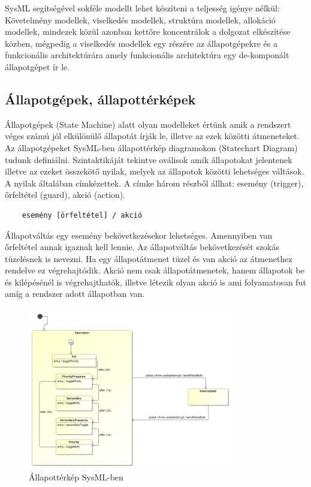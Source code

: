 SysML segítségével sokféle modellt lehet készíteni a teljesség igénye nélkül: Követelmény modellek, viselkedés modellek, struktúra modellek, allokáció modellek, mindezek közül azonban kettőre koncentrálok a dolgozat elkészítése közben, mégpedig a viselkedés modellek egy részére az állapotgépekre és a funkcionális architektúrára amely funkcionális architektúra egy de-komponált állapotgépet ír le.



\subsection{Állapotgépek, állapottérképek}

Állapotgépek (State Machine) alatt olyan modelleket értünk amik a rendszert véges számú jól elkülönülő állapotát írják le, illetve az ezek közötti átmeneteket. Az állapotgépeket SysML-ben állapottérkép diagramokon (Statechart Diagram) tudunk definiálni. Szintaktikáját tekintve oválisok amik állapotokat jelentenek illetve az ezeket összekötő nyilak, melyek az állapotok közötti lehetséges váltások. A nyilak általában címkézettek. A címke három részből állhat: esemény (trigger), őrfeltétel (guard), akció (action).

\lstset{framesep=10pt}
\begin{lstlisting}
	esemény [örfeltétel] / akció
\end{lstlisting}
Állapotváltás egy esemény bekövetkezésekor lehetséges. Amennyiben van őrfeltétel annak igaznak kell lennie. Az állapotváltás bekövetkezését szokás tüzelésnek is nevezni. Ha egy állapotátmenet tüzel és van akció az átmenethez rendelve ez végrehajtódik.
Akció nem csak állapotátmenetek, hanem állapotok be és kilépésénél is végrehajthatók, illetve létezik olyan akció is ami folyamatosan fut amíg a rendszer adott állapotban van.

\begin{figure}[!ht]
	\centering
	\includegraphics[width=90mm, keepaspectratio]{figures/preliminaries/statechart.png}
	\caption{Állapottérkép SysML-ben}
	\label{fig:statechart}
\end{figure}

